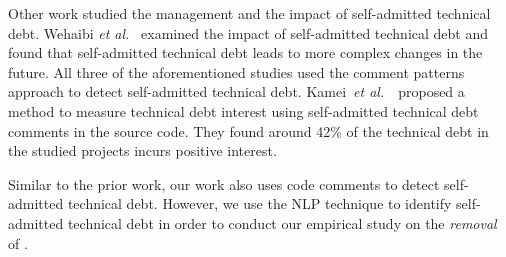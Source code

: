 Other work studied the management and the impact of self-admitted technical debt. Wehaibi \textit{et al.}~\cite{Wehaibi2016SANER} examined the impact of self-admitted technical debt and found that self-admitted technical debt leads to more complex changes in the future. All three of the aforementioned studies used the comment patterns approach to detect self-admitted technical debt. Kamei~\textit{et al.}~\cite{kameiusingTDA2016}~proposed a method to measure technical debt interest using self-admitted technical debt comments in the source code. They found around 42\% of the technical debt in the studied projects incurs positive interest.

 
Similar to the prior work, our work also uses code comments to detect self-admitted technical debt. However, we use the NLP technique to identify self-admitted technical debt in order to conduct our empirical study on the \emph{removal} of \SATD.










